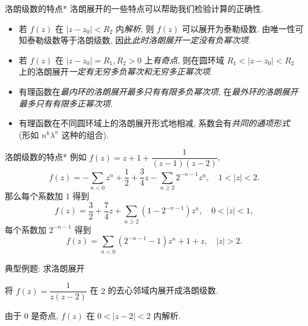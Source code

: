 \begin{frame}{洛朗级数的特点*}
\onslide<+->
洛朗展开的一些特点可以帮助我们检验计算的正确性.
\begin{itemize}
	\item  若 $f(z)$ 在 $|z-z_0|<R_2$ 内\emph{解析},
	\onslide<+->
	则 $f(z)$ 可以展开为泰勒级数.
	\onslide<+->
	由唯一性可知泰勒级数等于洛朗级数,
	\onslide<+->
	因此\emph{此时洛朗展开一定没有负幂次项}.
	\item 若 $f(z)$ 在 $|z-z_0|=R_1,R_2>0$ 上\emph{有奇点}, 则在圆环域 $R_1<|z-z_0|<R_2$ 上的洛朗展开\emph{一定有无穷多负幂次和无穷多正幂次项}.
	\item 有理函数在\emph{最内环的洛朗展开最多只有有限多负幂次项}, 在\emph{最外环的洛朗展开最多只有有限多正幂次项}.
	\item 有理函数在不同圆环域上的洛朗展开形式地相减, 系数会有\emph{共同的通项形式} (形如 $n^k\lambda^n$ 这种的组合).
\end{itemize}
\end{frame}


\begin{frame}{洛朗级数的特点*}
\onslide<+->
例如 $f(z)=z+1+\dfrac1{(z-1)(z-2)}$,
\[f(z)=-\sum_{n<0}z^n+\frac12+\frac34z-\sum_{n\ge 2}2^{-n-1}z^n,\quad 1<|z|<2.\]
\onslide<+->
那么每个系数加 $1$ 得到
\[f(z)=\frac32+\frac74z+\sum_{n\ge 2}(1-2^{-n-1})z^n,\quad 0<|z|<1,\]
\onslide<+->
每个系数加 $2^{-n-1}$ 得到
\[f(z)=\sum_{n<0}(2^{-n-1}-1)z^n+1+z,\quad |z|>2.\]
\end{frame}


\begin{frame}{典型例题: 求洛朗展开}
\onslide<+->
\begin{example}
将 $f(z)=\dfrac1{z(z-2)}$ 在 $2$ 的去心邻域内展开成洛朗级数.
\end{example}
\onslide<+->
\begin{solution}
由于 $0$ 是奇点, $f(z)$ 在 $0<|z-2|<2$ 内解析.
\vspace{-0.7\baselineskip}
\end{solution}
\end{frame}



